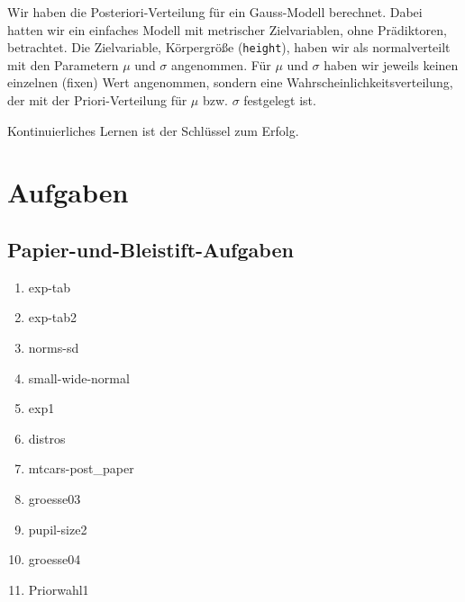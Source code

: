 \documentclass[
  ngerman,
  letterpaper,
  twoside,
  open=any]{scrbook}
\providecommand{\tightlist}{%
  \setlength{\itemsep}{0pt}\setlength{\parskip}{0pt}}\usepackage{longtable,booktabs,array}
\theoremstyle{definition}
\theoremstyle{plain}
\theoremstyle{definition}
\theoremstyle{definition}
\theoremstyle{definition}
\theoremstyle{definition}
\theoremstyle{remark}
\begin{document}
Wir haben die Posteriori-Verteilung für ein Gauss-Modell berechnet.
Dabei hatten wir ein einfaches Modell mit metrischer Zielvariablen, ohne
Prädiktoren, betrachtet. Die Zielvariable, Körpergröße
(\texttt{height}), haben wir als normalverteilt mit den Parametern
\(\mu\) und \(\sigma\) angenommen. Für \(\mu\) und \(\sigma\) haben wir
jeweils keinen einzelnen (fixen) Wert angenommen, sondern eine
Wahrscheinlichkeitsverteilung, der mit der Priori-Verteilung für \(\mu\)
bzw. \(\sigma\) festgelegt ist.

\begin{tcolorbox}[enhanced jigsaw, arc=.35mm, bottomrule=.15mm, bottomtitle=1mm, breakable, colback=white, colbacktitle=quarto-callout-important-color!10!white, colframe=quarto-callout-important-color-frame, coltitle=black, left=2mm, leftrule=.75mm, opacityback=0, opacitybacktitle=0.6, rightrule=.15mm, title=\textcolor{quarto-callout-important-color}{\faExclamation}\hspace{0.5em}{Wichtig}, titlerule=0mm, toprule=.15mm, toptitle=1mm]

Kontinuierliches Lernen ist der Schlüssel zum Erfolg.

\end{tcolorbox}

\section{Aufgaben}\label{aufgaben-7}

\subsection{Papier-und-Bleistift-Aufgaben}\label{papier-und-bleistift-aufgaben-2}

\begin{enumerate}
\def\labelenumi{\arabic{enumi}.}
\tightlist
\item
  exp-tab
\item
  exp-tab2
\item
  norms-sd
\item
  small-wide-normal
\item
  exp1
\item
  distros
\item
  mtcars-post\_paper
\item
  groesse03
\item
  pupil-size2
\item
  groesse04
\item
  Priorwahl1
\end{enumerate}
\end{document}

